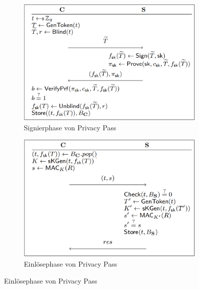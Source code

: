\documentclass[
	fontsize=11pt,
	headings=small,
	parskip=half,           %
	bibliography=totoc,
	numbers=noenddot,       %
	open=any,               %
]{scrreprt}
\begin{document}
\begin{figure}[h]
    \centering
    \begin{subfigure}[b]{0.45\textwidth}
        \includegraphics[width=\textwidth]{pp_signphase.png}
        \caption{Signierphase von Privacy Pass \cite{pp-davidson2018privacy}}
        \label{fig:pp-signingphase}
    \end{subfigure}
    \hfill
    \begin{subfigure}[b]{0.45\textwidth}
        \includegraphics[width=\textwidth]{pp-redemptionphase.png} 
        \caption{Einlösephase von Privacy Pass \cite{pp-davidson2018privacy}}
        \label{fig:pp-redemptoinphase}    
    \end{subfigure}
\end{figure}
\end{document}
